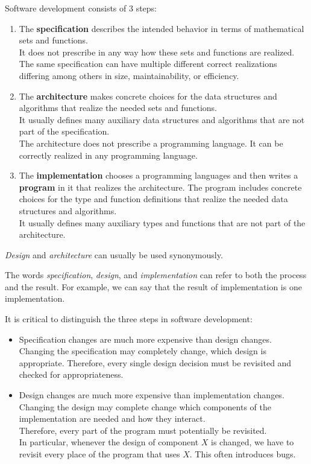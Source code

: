 Software development consists of $3$ steps:
\begin{enumerate}
\item The \textbf{specification} describes the intended behavior in terms of mathematical sets and functions.\\
It does not prescribe in any way how these sets and functions are realized.
The same specification can have multiple different correct realizations differing among others in size, maintainability, or efficiency.
\item The \textbf{architecture} makes concrete choices for the data structures and algorithms that realize the needed sets and functions.\\
It usually defines many auxiliary data structures and algorithms that are not part of the specification.\\
The architecture does not prescribe a programming language. It can be correctly realized in any programming language.
\item The \textbf{implementation} chooses a programming languages and then writes a \textbf{program} in it that realizes the architecture.
The program includes concrete choices for the type and function definitions that realize the needed data structures and algorithms.\\
It usually defines many auxiliary types and functions that are not part of the architecture.
\end{enumerate}

\begin{terminology}
\emph{Design} and \emph{architecture} can usually be used synonymously.

The words \emph{specification}, \emph{design}, and \emph{implementation} can refer to both the process and the result.
For example, we can say that the result of implementation is one implementation.
\end{terminology}

It is critical to distinguish the three steps in software development:
\begin{itemize}
 \item Specification changes are much more expensive than design changes.
 Changing the specification may completely change, which design is appropriate.
 Therefore, every single design decision must be revisited and checked for appropriateness.
 \item Design changes are much more expensive than implementation changes.
 Changing the design may complete change which components of the implementation are needed and how they interact.\\
 Therefore, every part of the program must potentially be revisited. \\
 In particular, whenever the design of component $X$ is changed, we have to revisit every place of the program that uses $X$. 
 This often introduces bugs.
\end{itemize}

